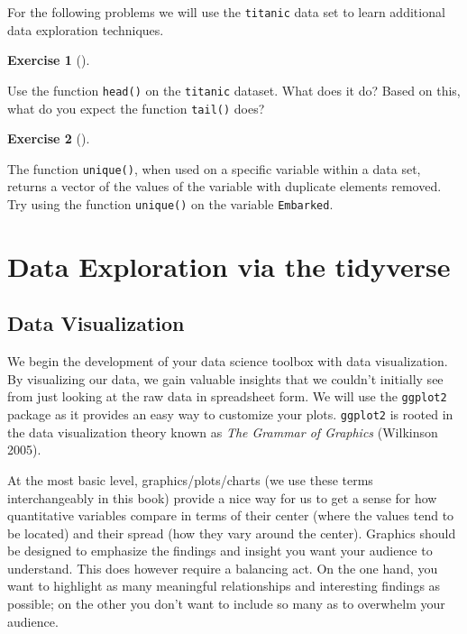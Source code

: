 \documentclass[
  letterpaper,
  DIV=11,
  numbers=noendperiod]{scrreprt}
\theoremstyle{definition}
\newtheorem{exercise}{Exercise}[chapter]
\theoremstyle{remark}
\begin{document}
For the following problems we will use the \texttt{titanic} data set to
learn additional data exploration techniques.

\leavevmode{}%
\begin{exercise}[]\label{exr-ch01-adv1}

Use the function \texttt{head()} on the \texttt{titanic} dataset. What
does it do? Based on this, what do you expect the function
\texttt{tail()} does?

\end{exercise}

\leavevmode{}%
\begin{exercise}[]\label{exr-ch01-adv2}

The function \texttt{unique()}, when used on a specific variable within
a data set, returns a vector of the values of the variable with
duplicate elements removed. Try using the function \texttt{unique()} on
the variable \texttt{Embarked}.

\end{exercise}

\part{Data Exploration via the tidyverse}

\hypertarget{sec-viz}{%
\chapter{Data Visualization}\label{sec-viz}}

We begin the development of your data science toolbox with data
visualization. By visualizing our data, we gain valuable insights that
we couldn't initially see from just looking at the raw data in
spreadsheet form. We will use the \texttt{ggplot2} package as it
provides an easy way to customize your plots. \texttt{ggplot2} is rooted
in the data visualization theory known as \emph{The Grammar of Graphics}
(Wilkinson 2005).

At the most basic level, graphics/plots/charts (we use these terms
interchangeably in this book) provide a nice way for us to get a sense
for how quantitative variables compare in terms of their center (where
the values tend to be located) and their spread (how they vary around
the center). Graphics should be designed to emphasize the findings and
insight you want your audience to understand. This does however require
a balancing act. On the one hand, you want to highlight as many
meaningful relationships and interesting findings as possible; on the
other you don't want to include so many as to overwhelm your audience.
\end{document}
